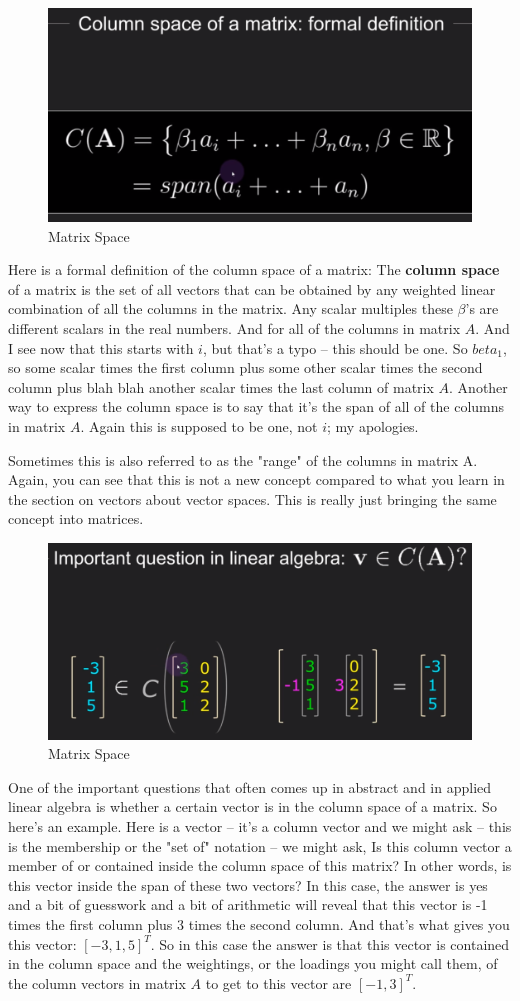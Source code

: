 \documentclass[fleqn,10pt]{olplainarticle}
\theoremstyle{definition}
\theoremstyle{remark}
\begin{document}
\begin{figure}[ht]
	\centering
	\includegraphics[width=0.5\linewidth]{images/matrix-space-02.png}
	\caption{Matrix Space}
	\label{fig:matrix_space_02}
\end{figure}

Here is a formal definition of the column space of a matrix: The \textbf{column space} of a matrix is the set of all vectors that can be obtained by any weighted linear combination of all the columns in the matrix. Any scalar multiples these $\beta$'s are different scalars in the real numbers. And for all of the columns in matrix $A$. And I see now that this starts with $i$, but that's a typo -- this should be one. So $beta_1$, so some scalar times the first column plus some other scalar times the second column plus blah blah another scalar times the last column of matrix $A$. Another way to express the column space is to say that it's the span of all of the columns in matrix $A$. Again this is supposed to be one, not $i$; my apologies.

Sometimes this is also referred to as the "range" of the columns in matrix A. Again, you can see that this is not a new concept compared to what you learn in the section on vectors about vector spaces. This is really just bringing the same concept into matrices.

\begin{figure}[ht]
	\centering
	\includegraphics[width=0.5\linewidth]{images/matrix-space-03.png}
	\caption{Matrix Space}
	\label{fig:matrix_space_03}
\end{figure}

One of the important questions that often comes up in abstract and in applied linear algebra is whether a certain vector is in the column space of a matrix. So here's an example. Here is a vector -- it's a column vector and we might ask -- this is the membership or the "set of" notation -- we might ask, Is this column vector a member of or contained inside the column space of this matrix? In other words, is this vector inside the span of these two vectors? In this case, the answer is yes and a bit of guesswork and a bit of arithmetic will reveal that this vector is -1 times the first column plus 3 times the second column. And that's what gives you this vector: $[-3, 1, 5]^T$. So in this case the answer is that this vector is contained in the column space and the weightings, or the loadings you might call them, of the column vectors in matrix $A$ to get to this vector are $[-1, 3]^T$.
\end{document}
